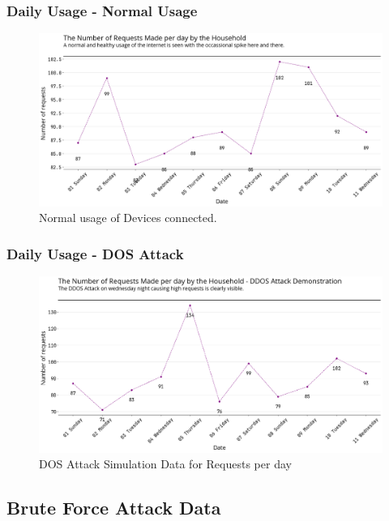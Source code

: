 \documentclass[11pt]{article}
\begin{document}
\subsubsection{Daily Usage - Normal Usage}
\begin{figure}[H]
    \centering
    \includegraphics[width=.95\textwidth]{router_log_analysis_graphs/normal_requests_per_day.png}
    \caption{Normal usage of Devices connected. }
\end{figure}

\subsubsection{Daily Usage - DOS Attack}
\begin{figure}[H]
    \centering
    \includegraphics[width=.95\textwidth]{router_log_analysis_graphs/ddos_requests_per_day.png}
    \caption{DOS Attack Simulation Data for Requests per day}
\end{figure}


\subsection{Brute Force Attack Data}
\end{document}
